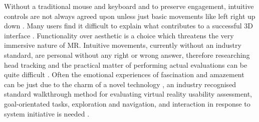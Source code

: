 \documentclass{scrartcl}
\begin{document}
Without a traditional mouse and keyboard and to preserve engagement, intuitive controls are not always agreed upon \cite{nielsen2003procedure} unless just basic movements like left right up down \cite{oskoei2009application}. Many users find it difficult to explain what contributes to a successful 3D interface \cite{john1998traditional}. Functionality over aesthetic is a choice which threatens the very immersive nature of MR. Intuitive movements, currently without an industry standard, are personal without any right or wrong answer, therefore researching head tracking \cite{azuma1993tracking} and the practical matter of performing actual evaluations can be quite difficult \cite{bowman2002survey}. Often the emotional experiences of fascination and amazement can be just due to the charm of a novel technology \cite{olsson2012narratives}, an industry recognised standard walkthrough method for evaluating virtual reality usability assessment, goal-orientated tasks, exploration and navigation, and interaction in response to system initiative is needed \cite{sutcliffe2000evaluating}.




\end{document}
